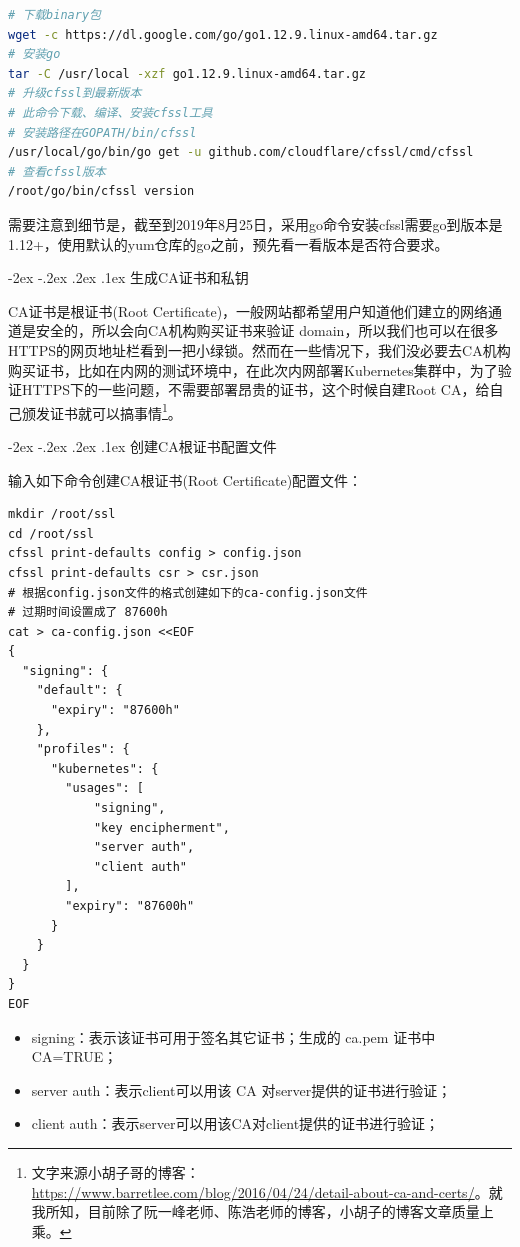 \documentclass[8pt]{book}
\makeatletter
\numberwithin{dummy}{section}
\theoremstyle{ocrenumbox}
\theoremstyle{blacknumex}
\theoremstyle{blacknumbox}
\theoremstyle{ocrenum}
\renewcommand\paragraph{\@startsection{paragraph}{4}{\z@}
	{-2ex \@plus-.2ex \@minus .2ex}
	{.1ex}
	{\normalfont\small\sffamily\bfseries}}
\makeatother
\begin{document}
\begin{lstlisting}[language=Bash]
# 下载binary包
wget -c https://dl.google.com/go/go1.12.9.linux-amd64.tar.gz
# 安装go
tar -C /usr/local -xzf go1.12.9.linux-amd64.tar.gz
# 升级cfssl到最新版本
# 此命令下载、编译、安装cfssl工具
# 安装路径在GOPATH/bin/cfssl
/usr/local/go/bin/go get -u github.com/cloudflare/cfssl/cmd/cfssl
# 查看cfssl版本
/root/go/bin/cfssl version
\end{lstlisting}

需要注意到细节是，截至到2019年8月25日，采用go命令安装cfssl需要go到版本是1.12+，使用默认的yum仓库的go之前，预先看一看版本是否符合要求。

\paragraph{生成CA证书和私钥}

CA证书是根证书(Root Certificate)，一般网站都希望用户知道他们建立的网络通道是安全的，所以会向CA机构购买证书来验证 domain，所以我们也可以在很多HTTPS的网页地址栏看到一把小绿锁。然而在一些情况下，我们没必要去CA机构购买证书，比如在内网的测试环境中，在此次内网部署Kubernetes集群中，为了验证HTTPS下的一些问题，不需要部署昂贵的证书，这个时候自建Root CA，给自己颁发证书就可以搞事情\footnote{文字来源小胡子哥的博客：\url{https://www.barretlee.com/blog/2016/04/24/detail-about-ca-and-certs/}。就我所知，目前除了阮一峰老师、陈浩老师的博客，小胡子的博客文章质量上乘。}。

\paragraph{创建CA根证书配置文件}

输入如下命令创建CA根证书(Root Certificate)配置文件：

\begin{lstlisting}
mkdir /root/ssl
cd /root/ssl
cfssl print-defaults config > config.json
cfssl print-defaults csr > csr.json
# 根据config.json文件的格式创建如下的ca-config.json文件
# 过期时间设置成了 87600h
cat > ca-config.json <<EOF
{
  "signing": {
    "default": {
      "expiry": "87600h"
    },
    "profiles": {
      "kubernetes": {
        "usages": [
            "signing",
            "key encipherment",
            "server auth",
            "client auth"
        ],
        "expiry": "87600h"
      }
    }
  }
}
EOF
\end{lstlisting}

\begin{itemize}
\item{signing：表示该证书可用于签名其它证书；生成的 ca.pem 证书中 CA=TRUE；}
\item{server auth：表示client可以用该 CA 对server提供的证书进行验证；}
\item{client auth：表示server可以用该CA对client提供的证书进行验证；}
\end{itemize}
\end{document}
